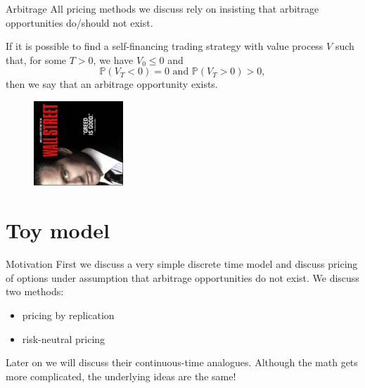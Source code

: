 \documentclass[pdf, handout]{beamer}
\begin{document}
\begin{frame}{Arbitrage}
All pricing methods we discuss rely on insisting that arbitrage opportunities do/should not
exist.

\begin{definition}
If it is possible to find a self-financing trading strategy with value process $V$ such that, for some  $T>0$, we have
$V_0\leq 0$ and
\[
\mathbb{P}( V_T< 0 )=0 \text{ and }  \mathbb{P}( V_T> 0 )>0,
\]
then we say that an arbitrage opportunity exists.
\end{definition}
\begin{figure}
\includegraphics[angle=270,width=0.3\textwidth]{gordon-gekko.eps}
\end{figure}
\end{frame}

\section{Toy model}

\begin{frame}{Motivation}
First we discuss a very simple discrete time model and discuss pricing of options under assumption that arbitrage opportunities do not exist.
We discuss two methods:
\begin{itemize}
\item pricing by replication
\item risk-neutral pricing
\end{itemize}
Later on we will discuss their continuous-time analogues.
Although the math gets more complicated, 
the underlying ideas are the same!
\end{frame}
\end{document}
